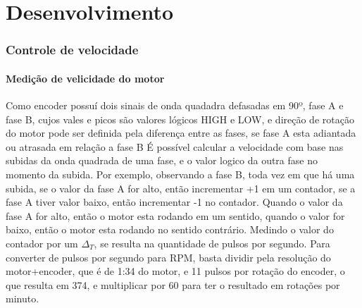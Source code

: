 

\chapter{Desenvolvimento}

\subsection{Controle de velocidade}

\subsubsection{Medição de velicidade do motor}

Como encoder possuí dois sinais de onda quadadra defasadas em 90º, fase A e fase B, cujos vales e picos são valores lógicos HIGH e LOW, 
e direção de rotação do motor pode ser definida pela diferença entre as fases, se fase A esta adiantada ou atrasada em relação a fase B
É possível calcular a velocidade com base nas subidas da onda quadrada de uma fase, e o valor logico da outra fase no momento da subida.
Por exemplo,  observando a fase B, toda vez em que há uma subida, se o valor da fase A for alto, então incrementar +1 em um contador, se a fase A tiver valor baixo, então incrementar -1 no contador.
Quando o valor da fase A for alto, então o motor esta rodando em um sentido,  quando o valor  for baixo, então o motor esta rodando no sentido contrário.
Medindo o valor do contador por um $\Delta_{T}$, se resulta na quantidade de pulsos por segundo.
Para converter de pulsos por segundo para RPM, basta dividir pela resolução do motor+encoder,  que é de 1:34 do motor, e 11 pulsos por rotação do encoder, o que resulta em 374,
e multiplicar por 60 para ter o resultado em rotações por minuto.




